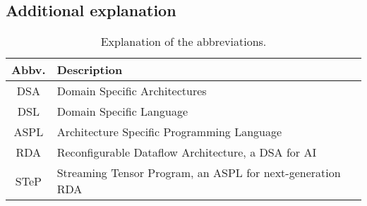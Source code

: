 \subsection{Additional explanation}
\begin{table}[htb]
    \centering
    \begin{tabular}{c|l}
    \toprule
        Abbv. & Description \\
        \midrule
         DSA & Domain Specific Architectures \\
         DSL & Domain Specific Language \\
         ASPL & Architecture Specific Programming Language \\
         RDA & Reconfigurable Dataflow Architecture, a DSA for AI \\
         STeP & Streaming Tensor Program, an ASPL for next-generation RDA \\
        \bottomrule
    \end{tabular}
    \caption{Explanation of the abbreviations.}
    \label{tab:abbv}
\end{table}



\newpage
